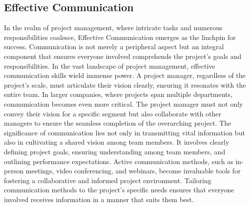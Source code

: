 \documentclass[runningheads]{llncs}
\begin{document}
\subsection{Effective Communication}

In the realm of project management, where intricate tasks and numerous responsibilities coalesce, Effective Communication emerges as the linchpin for success. Communication is not merely a peripheral aspect but an integral component that ensures everyone involved comprehends the project's goals and responsibilities. In the vast landscape of project management, effective communication skills wield immense power. A project manager, regardless of the project's scale, must articulate their vision clearly, ensuring it resonates with the entire team. In larger companies, where projects span multiple departments, communication becomes even more critical. The project manager must not only convey their vision for a specific segment but also collaborate with other managers to ensure the seamless completion of the overarching project. The significance of communication lies not only in transmitting vital information but also in cultivating a shared vision among team members. It involves clearly defining project goals, ensuring understanding among team members, and outlining performance expectations. Active communication methods, such as in-person meetings, video conferencing, and webinars, become invaluable tools for fostering a collaborative and informed project environment. Tailoring communication methods to the project's specific needs ensures that everyone involved receives information in a manner that suits them best.

\end{document}
